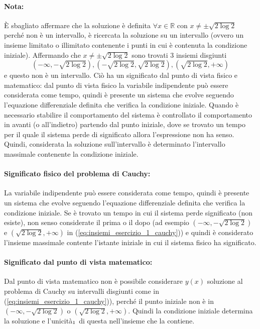 \begin{example}
    \paragraph{Nota:}
    È sbagliato affermare che la soluzione è definita $\forall x\in\mathbb R$ con $x\neq \pm\sqrt{2\log2}$ perché non è un intervallo, è ricercata la soluzione su un intervallo (ovvero un insieme limitato o illimitato contenente i punti in cui è contenuta la condizione iniziale). Affermando che $x\neq\pm\sqrt{2\log2}$ sono trovati 3 insiemi disgiunti
    \begin{equation}\label{eq:insiemi_esercizio_1_cauchy}
        (-\infty, -\sqrt{2\log2}), (-\sqrt{2\log2}, \sqrt{2\log2}), (\sqrt{2\log2}, +\infty)
    \end{equation}
    e questo non è un intervallo. Ciò ha un significato dal punto di vista fisico e matematico: dal punto di vista fisico la variabile indipendente può essere considerata come tempo, quindi è presente un sistema che evolve seguendo l'equazione differenziale definita che verifica la condizione iniziale. Quando è necessario stabilire il comportamento del sistema è controllato il comportamento in avanti (o all'indietro) partendo dal punto iniziale, dove se trovato un tempo per il quale il sistema perde di significato allora l'espressione non ha senso.\\
    Quindi, considerata la soluzione sull'intervallo è determinato l'intervallo massimale contenente la condizione iniziale.\\
    \paragraph{Significato fisico del problema di Cauchy:} La variabile indipendente può essere considerata come tempo, quindi è presente un sistema che evolve seguendo l'equazione differenziale definita che verifica la condizione iniziale. Se è trovato un tempo in cui il sistema perde significato (non esiste), non senso considerate il prima o il dopo (ad esempio $(-\infty, -\sqrt{2\log2})$ e $ (\sqrt{2\log2}, +\infty)$ in (\ref{eq:insiemi_esercizio_1_cauchy})) e quindi è considerato l'insieme massimale contente l'istante iniziale in cui il sistema fisico ha significato.
    \paragraph{Significato dal punto di vista matematico:} Dal punto di vista matematico non è possibile considerare $y(x)$ soluzione al problema di Cauchy su intervalli disgiunti come in (\ref{eq:insiemi_esercizio_1_cauchy})), perché il punto iniziale non è in $(-\infty, -\sqrt{2\log2})$ o $ (\sqrt{2\log2}, +\infty)$. Quindi la condizione iniziale determina la soluzione e l'unicità$_{\footnotemark}$ di questa nell'insieme che la contiene.
\end{example}

